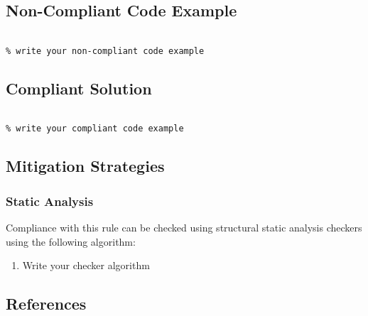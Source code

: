 \subsection{Non-Compliant Code Example}


\begin{verbatim}

% write your non-compliant code example

\end{verbatim}

\subsection{Compliant Solution}


\begin{verbatim}

% write your compliant code example

\end{verbatim}

\subsection{Mitigation Strategies}
\subsubsection{Static Analysis} 

Compliance with this rule can be checked using structural static analysis checkers using the following algorithm:

\begin{enumerate}
\item Write your checker algorithm
\end{enumerate}

\subsection{References}

